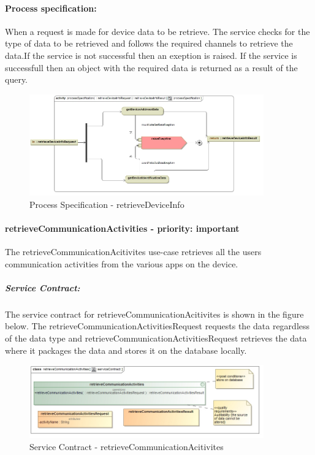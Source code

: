 \documentclass[hidelinks, 12pt, oneside]{article}
\begin{document}
		
		\paragraph{Process specification:}
		When a request is made for device data to be retrieve. The service checks for the type of data to 			be retrieved and follows the required channels to retrieve the data.If the service is not 					successful then an exeption is raised. If the service is successfull then an object with the 				required data is returned as a result of the query.
		
		\begin{figure}[!htbp]
    		\centering
    		\includegraphics[width=0.9\textwidth]{img/processSpecificationRetrieveDeviceInfo.jpg}
    		\caption{Process Specification - retrieveDeviceInfo}
    		\label{fig:ProcessSpec_retrieveDeviceInfo}
		\end{figure}
		
		
		\paragraph{retrieveCommunicationActivities - priority: important}
		The retrieveCommunicationAcitivites use-case retrieves all the users communication activities from 		the various apps on the device.\newpage
		
		\subparagraph{Service Contract:}
		The service contract for retrieveCommunicationAcitivites is shown in the figure below. The 					retrieveCommunicationActivitiesRequest requests the data regardless of the data type and 		retrieveCommunicationActivitiesRequest retrieves the data where it packages the data and stores it on the database locally.
		
		\begin{figure}[!htbp]
    		\centering
    		\includegraphics[width=0.9\textwidth]{img/serviceContractRetrieveCommunicationActivities.jpg}
    		\caption{Service Contract - retrieveCommunicationAcitivites}
    		\label{fig:ServiceCon_retrieveCommunicationAcitivites}
		\end{figure}
				
\end{document}

